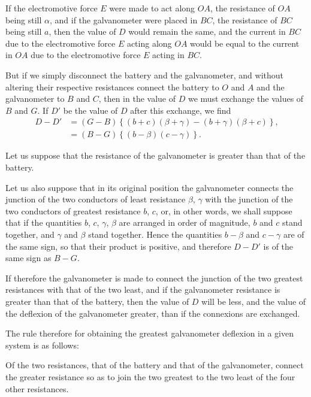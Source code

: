 \documentclass[12pt,oneside]{book}[2021/10/04]
\newcommand{\¬}{\hphantom{0}}
\begin{document}
If the electromotive force \(E\) were made to act along \(OA\), the
resistance of \(OA\) being still \(\alpha\), and if the galvanometer were placed
in \(BC\), the resistance of \(BC\) being still \(a\), then the value of \(D\) would
remain the same, and the current in \(BC\) due to the electromotive
force \(E\) acting along \(OA\) would be equal to the current in \(OA\) due
to the electromotive force \(E\) acting in \(BC\).

But if we simply disconnect the battery and the galvanometer,
and without altering their respective resistances connect the battery
to \(O\) and \(A\) and the galvanometer to \(B\) and \(C\), then in the value of
\(D\) we must exchange the values of \(B\) and \(G\). If \(D'\) be the value of
\(D\) after this exchange, we find
\[
  \begin{aligned}
    D - D' &= (G - B) \left\{ (b + c)(\beta + \gamma) - (b + \gamma)(\beta + c) \right\}\text{,}\\
    &= (B - G) \left\{ (b - \beta)(c - \gamma) \right\}\text{.}
  \end{aligned}
\]

Let us suppose that the resistance of the galvanometer is greater
than that of the battery.

Let us also suppose that in its original position the galvanometer
connects the junction of the two conductors of least resistance \(\beta\), \(\gamma\)
with the junction of the two conductors of greatest resistance \(b\), \(c\),
or, in other words, we shall suppose that if the quantities \(b\), \(c\), \(\gamma\), \(\beta\)
are arranged in order of magnitude, \(b\) and \(c\) stand together, and
\(\gamma\) and \(\beta\) stand together. Hence the quantities \(b - \beta\) and \(c - \gamma\) are
of the same sign, so that their product is positive, and therefore
\(D - D'\) is of the same sign as \(B - G\).

If therefore the galvanometer is made to connect the junction of
the two greatest resistances with that of the two least, and if
the galvanometer resistance is greater than that of the battery,
then the value of \(D\) will be less, and the value of the deflexion of
the galvanometer greater, than if the connexions are exchanged.

The rule therefore for obtaining the greatest galvanometer deflexion
in a given system is as follows:

Of the two resistances, that of the battery and that of the
galvanometer, connect the greater resistance so as to join the two
greatest to the two least of the four other resistances.
\end{document}
